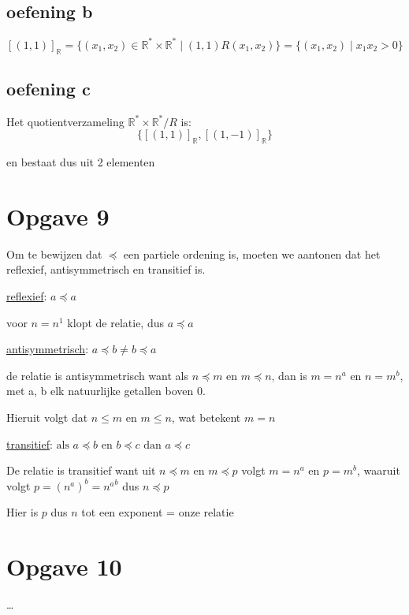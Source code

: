 \documentclass[11pt, a4paper]{article}
\begin{document}
\subsection*{oefening b}

\[
{[(1,1)]}_{\mathbb{R}} = \{(x_1,x_2) \in \mathbb{R}^{*} \times \mathbb{R}^{*} \mid (1,1) R (x_1,x_2) \} = \{(x_1,x_2) \mid x_1 x_2 > 0 \}
\]


\subsection*{oefening c}

Het quotientverzameling $\mathbb{R}^{*} \times \mathbb{R}^{*} / R$ is:
\[
\{ {[(1,1)]}_{\mathbb{R}}, {[(1,-1)]}_{\mathbb{R}} \}
\]

en bestaat dus uit 2 elementen

\pagebreak
\section*{Opgave 9}

Om te bewijzen dat $\preceq$ een partiele ordening is, moeten we aantonen dat het reflexief, antisymmetrisch en transitief is.

\underline{reflexief}:
$a \preceq a$

voor $n = n^1$ klopt de relatie, dus $a \preceq a$


\underline{antisymmetrisch}:
$a \preceq b \neq b \preceq a$

de relatie is antisymmetrisch want als $n \preceq m$ en $m \preceq n$, dan is $m = n^a$ en $n = m^b$, met a, b elk natuurlijke getallen boven 0.

Hieruit volgt dat $n \leq m$ en $m \leq n$, wat betekent $m = n$

\underline{transitief}:
$\text{als } a \preceq b \text{ en } b \preceq c \text{ dan } a \preceq c$

De relatie is transitief want uit $n \preceq m$ en $m \preceq p$ volgt $m = n^a$ en $p = m^b$, waaruit volgt $p = {(n^a)}^b = {n^a}^b$ dus $n \preceq p$

Hier is $p$ dus $n$ tot een exponent = onze relatie


\pagebreak
\section*{Opgave 10}
\ldots
\end{document}
